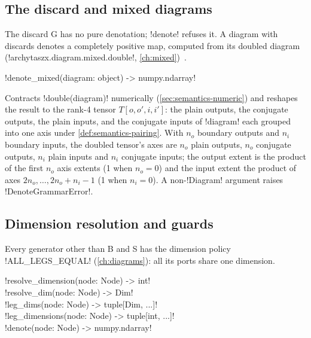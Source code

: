 \subsection{The discard and mixed diagrams}\label{sec:semantics-denote-mixed}

The discard G has no pure denotation; \py!denote! refuses it. A diagram with discards denotes a completely positive map, computed from its doubled diagram (\py!archytaszx.diagram.mixed.double!, \cref{ch:mixed})~\cite{selinger2007cpm,carette2019mixed}.

\begin{signature}
\py!denote_mixed(diagram: object) -> numpy.ndarray!
\end{signature}
\noindent Contracts \py!double(diagram)! numerically (\cref{sec:semantics-numeric}) and reshapes the result to the rank-4 tensor $T[o,o',i,i']$: the plain outputs, the conjugate outputs, the plain inputs, and the conjugate inputs of \py!diagram! each grouped into one axis under \cref{def:semantics-pairing}. With $n_o$ boundary outputs and $n_i$ boundary inputs, the doubled tensor's axes are $n_o$ plain outputs, $n_o$ conjugate outputs, $n_i$ plain inputs and $n_i$ conjugate inputs; the output extent is the product of the first $n_o$ axis extents (1 when $n_o=0$) and the input extent the product of axes $2n_o,\dots,2n_o+n_i-1$ (1 when $n_i=0$). A non-\py!Diagram! argument raises \py!DenoteGrammarError!.

\subsection{Dimension resolution and guards}

Every generator other than B and S has the dimension policy \py!ALL_LEGS_EQUAL! (\cref{ch:diagrams}): all its ports share one dimension.

\begin{signature}
\py!resolve_dimension(node: Node) -> int!\\
\py!resolve_dim(node: Node) -> Dim!\\
\py!leg_dims(node: Node) -> tuple[Dim, ...]!\\
\py!leg_dimensions(node: Node) -> tuple[int, ...]!\\
\py!denote(node: Node) -> numpy.ndarray!
\end{signature}


